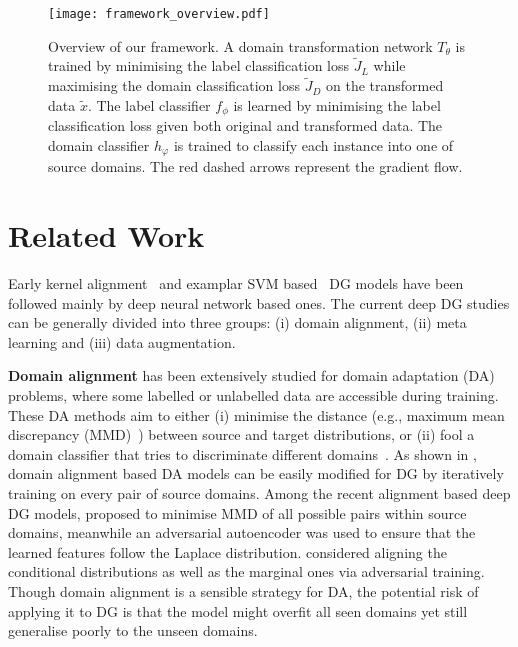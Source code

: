 \documentclass[letterpaper]{article}
\newcommand{\keypoint}[1]{\vspace{0.1cm}\noindent\textbf{#1}}
\begin{document}
\begin{figure*}[ht]
\centering
\texttt{[image: framework\_overview.pdf]}
\caption{\small Overview of our framework. A domain transformation network $T_\theta$ is trained by minimising the label classification loss $\tilde{J}_L$ while maximising the domain classification loss $\tilde{J}_D$ on the transformed data $\tilde{x}$. The label classifier $f_\phi$ is learned by minimising the label classification loss given both original and transformed data. The domain classifier $h_\varphi$ is trained to classify each instance into one of source domains. The red dashed arrows represent the gradient flow.}
\label{fig:framework_overview}
\vspace{-0.2cm}
\end{figure*}



\section{Related Work} \label{sec:related_work}
Early kernel alignment~\cite{muandet2013domain,gan2016learning} and examplar SVM based~\cite{xu2014exploiting,niu2015multiview} DG models have been followed mainly by deep neural network based ones. The current deep DG studies can be generally divided into three groups: (i) domain alignment, (ii) meta learning and (iii) data augmentation.

\keypoint{Domain alignment} has been extensively studied for domain adaptation (DA) problems, where some labelled or unlabelled data are accessible during training. These DA methods aim to either (i) minimise the distance (e.g., maximum mean discrepancy (MMD)~\cite{pan2008transfer}) between source and target distributions, or (ii) fool a domain classifier that tries to discriminate different domains~\cite{ganin2015unsupervised}. As shown in \cite{motiian2017unified}, domain alignment based DA models can be easily modified for DG by iteratively training on every pair of source domains. Among the recent alignment based deep DG models, \cite{li2018mmdaae} proposed to minimise MMD of all possible pairs within source domains, meanwhile an adversarial autoencoder was used to ensure that the learned features follow the Laplace distribution. \cite{li2018ciddg} considered aligning the conditional distributions as well as the marginal ones via adversarial training.
Though domain alignment is a sensible strategy for DA, the potential risk of applying it to DG is that the model might overfit all seen domains yet still generalise poorly to the unseen domains.
\end{document}
